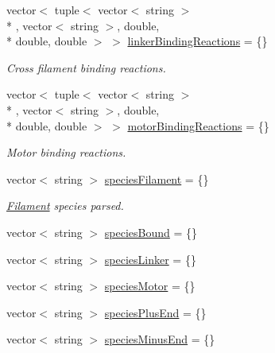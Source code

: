 {\bf }\par
\begin{DoxyCompactItemize}
\item 
vector$<$ tuple$<$ vector$<$ string $>$\\*
, vector$<$ string $>$, double, \\*
double, double $>$ $>$ \hyperlink{structChemistryData_ae3e27a2c950e196017c06f416ee94628}{linker\+Binding\+Reactions} = \{\}
\begin{DoxyCompactList}\small\item\em Cross filament binding reactions. \end{DoxyCompactList}\item 
vector$<$ tuple$<$ vector$<$ string $>$\\*
, vector$<$ string $>$, double, \\*
double, double $>$ $>$ \hyperlink{structChemistryData_a2a4b2e949b6e0b8f32158cf101d24fa6}{motor\+Binding\+Reactions} = \{\}
\begin{DoxyCompactList}\small\item\em Motor binding reactions. \end{DoxyCompactList}\end{DoxyCompactItemize}

{\bf }\par
\begin{DoxyCompactItemize}
\item 
vector$<$ string $>$ \hyperlink{structChemistryData_a3389b17268aaefcba28539ec3b5e5e35}{species\+Filament} = \{\}
\begin{DoxyCompactList}\small\item\em \hyperlink{classFilament}{Filament} species parsed. \end{DoxyCompactList}\item 
vector$<$ string $>$ \hyperlink{structChemistryData_acab0ca129148f43eaa33847782411b3a}{species\+Bound} = \{\}
\item 
vector$<$ string $>$ \hyperlink{structChemistryData_ab41e13ef134b8cb9066fff74ece920ca}{species\+Linker} = \{\}
\item 
vector$<$ string $>$ \hyperlink{structChemistryData_a273fd2565deae219bbd1fe3d557f53ba}{species\+Motor} = \{\}
\item 
vector$<$ string $>$ \hyperlink{structChemistryData_a627b89ad8dad87e03d249e5dc56eff5a}{species\+Plus\+End} = \{\}
\item 
vector$<$ string $>$ \hyperlink{structChemistryData_a8b638671871e8cc1ef65f2c7429d6254}{species\+Minus\+End} = \{\}
\end{DoxyCompactItemize}



